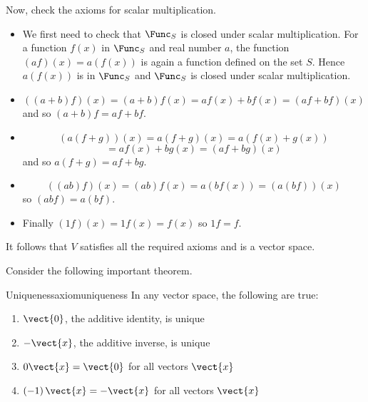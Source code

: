\begin{solution}
Now, check the axioms for scalar multiplication.
\begin{itemize}
\item
We first need to check that $\Func_S$ is closed under scalar multiplication. 
For a function $f(x)$ in $\Func_S$ and real number $a$, the function $(af)(x) = a(f(x))$ is again a function defined on the set $S$. Hence $a(f(x))$ is in $\Func_S$ and $\Func_S$ is closed under scalar multiplication. 

\item
\begin{equation*}
\left( \left( a+b\right) f\right) \left( x\right) = \left( a+b\right)
f\left( x\right) =af\left( x\right) +bf\left( x\right) = \left(
af+bf\right) \left( x\right)
\end{equation*}
and so $\left( a+b\right) f=af+bf$. 

\item
\begin{equation*}
\left( a\left( f+g\right) \right) \left( x\right) = a\left( f+g\right)
\left( x\right) = a\left( f\left( x\right) +g\left( x\right) \right)
\end{equation*}
\begin{equation*}
=af\left( x\right) +bg\left( x\right) = \left( af+bg\right) \left(
x\right)
\end{equation*}
and so $a\left( f+g\right) =af+bg$. 

\item
\begin{equation*}
\left( \left( ab\right) f\right) \left( x\right) = \left( ab\right)
f\left( x\right) =a\left( bf\left( x\right) \right) = \left( a\left(
bf\right) \right) \left( x\right)
\end{equation*}
so $\left( abf\right) =a\left( bf\right) $. 

\item
Finally $\left( 1f\right) \left(
x\right) = 1f\left( x\right) =f\left( x\right) $ so $1f=f$.
\end{itemize}

It follows that $V$ satisfies all the required axioms and is a vector space.
\end{solution}

Consider the following important theorem.

\begin{theorem}{Uniqueness}{axiomuniqueness}
In any vector space, the following are true:
\begin{enumerate}
\item
$\vect{0}$, the additive identity, is unique
\item
$-\vect{x}$, the additive inverse, is unique
\item
$0\vect{x}=\vect{0}$ for all vectors $\vect{x}$
\item
$\left( -1\right) \vect{x}=-\vect{x}$ for all vectors $\vect{x}$ 
\end{enumerate}
\end{theorem}

